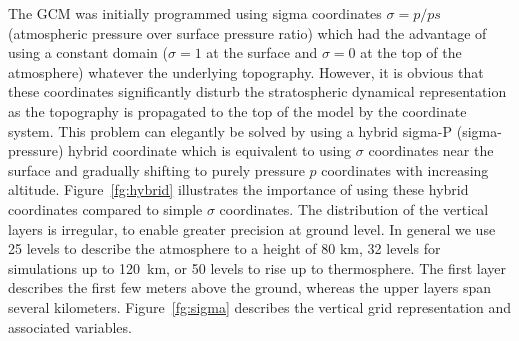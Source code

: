 The GCM was initially programmed using sigma coordinates $\sigma = p/ps$
(atmospheric pressure over surface pressure ratio)
which had the advantage of using a constant domain
($\sigma=1$ at the surface and $\sigma=0$ at the top of the atmosphere)
whatever the underlying topography.
However, it is obvious that these coordinates significantly disturb
the stratospheric dynamical representation as the topography is propagated
to the top of the model by the coordinate system.
This problem can elegantly be solved by using a hybrid sigma-P (sigma-pressure)
hybrid coordinate which is equivalent to using $\sigma$ coordinates
near the surface and gradually shifting to purely pressure $p$
coordinates with increasing altitude.
Figure~\ref{fg:hybrid} illustrates the importance of using these
hybrid coordinates compared to simple $\sigma$ coordinates.
The distribution of the vertical layers is irregular,
to enable greater precision at ground level.
In general we use 25 levels to describe the atmosphere to a height of 80 km,
32 levels for simulations up to 120~km, or 50 levels to rise
up to thermosphere.
The first layer describes the first few meters above the ground,
whereas the upper layers span several kilometers.
Figure~\ref{fg:sigma} describes the vertical grid representation
and associated variables.

